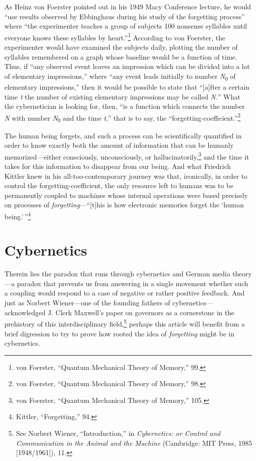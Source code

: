 \documentclass{tufte-handout}
\begin{document}
\noindent As Heinz von Foerster pointed out in his 1949 Macy Conference lecture,
he would ``use results observed by Ebbinghaus during his study of the
forgetting process'' where ``the experimenter teaches a group of
subjects 100 nonsense syllables until everyone knows these syllables by
heart.''\footnote{von Foerster, ``Quantum Mechanical Theory of Memory,''
  99.} According to von Foerster, the experimenter would have examined
the subjects daily, plotting the number of syllables remembered on a
graph whose baseline would be a function of time. Thus, if ``any
observed event leaves an impression which can be divided into a lot of
elementary impressions,'' where ``any event leads initially to number
\emph{N}\textsubscript{0} of elementary impressions,'' then it would be
possible to state that ``{[}a{]}fter a certain time \emph{t} the number
of existing elementary impressions may be called \emph{N.}'' What the
cybernetician is looking for, then, ``is a function which connects the
number \emph{N} with number \emph{N}\textsubscript{0} and the time
\emph{t},'' that is to say, the ``forgetting-coefficient.''\footnote{von
  Foerster, ``Quantum Mechanical Theory of Memory,'' 98.}

The human being forgets, and such a process can be scientifically
quantified in order to know exactly both the amount of information that
can be humanly memorized---either consciously, unconsciously, or
hallucinatorily,\footnote{von Foerster, ``Quantum Mechanical Theory of
  Memory,'' 105.} and the time it takes for this information to
disappear from our being. And what Friedrich Kittler knew in his
all-too-contemporary journey was that, ironically, in order to control
the forgetting-coefficient, the only resource left to humans was to be
permanently coupled to machines whose internal operations were based
precisely on processes of \emph{forgetting}---``{[}t{]}his is how
electronic memories forget the `human being.'\,''\footnote{Kittler,
  ``Forgetting,'' 94.}

\hypertarget{cybernetics}{%
\section{Cybernetics}\label{cybernetics}}

Therein lies the paradox that runs through cybernetics and German media
theory---a paradox that prevents us from answering in a single movement
whether such a coupling would respond to a case of negative or rather
positive feedback. And just as Norbert Wiener---one of the founding
fathers of cybernetics---acknowledged J. Clerk Maxwell's paper on
governors as a cornerstone in the prehistory of this interdisciplinary
field,\footnote{See Norbert Wiener, ``Introduction,'' in
  \emph{Cybernetics: or Control and Communication in the Animal and the
  Machine} (Cambridge: MIT Press, 1985 {[}1948/1961{]}), 11.} perhaps
this article will benefit from a brief digression to try to prove how
rooted the idea of \emph{forgetting} might be in cybernetics.
\end{document}

